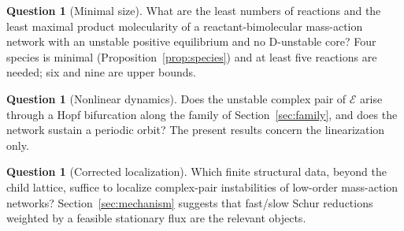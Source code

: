 \documentclass[11pt,a4paper]{article}
\theoremstyle{plain}
\theoremstyle{definition}
\newtheorem{question}[theorem]{Question}
\theoremstyle{remark}
\begin{document}
\begin{question}[Minimal size]
What are the least numbers of reactions and the least maximal product molecularity of a reactant-bimolecular mass-action network with an unstable positive equilibrium and no D-unstable core? Four species is minimal (Proposition~\ref{prop:species}) and at least five reactions are needed; six and nine are upper bounds.
\end{question}

\begin{question}[Nonlinear dynamics]
Does the unstable complex pair of $\mathcal E$ arise through a Hopf bifurcation along the family of Section~\ref{sec:family}, and does the network sustain a periodic orbit? The present results concern the linearization only.
\end{question}

\begin{question}[Corrected localization]
Which finite structural data, beyond the child lattice, suffice to localize complex-pair instabilities of low-order mass-action networks? Section~\ref{sec:mechanism} suggests that fast/slow Schur reductions weighted by a feasible stationary flux are the relevant objects.
\end{question}



\end{document}
